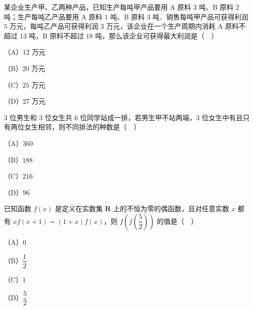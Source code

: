 \begin{question}
某企业生产甲、乙两种产品，已知生产每吨甲产品要用 A 原料 $3$ 吨、B 原料 $2$ 吨；生产每吨乙产品要用 A 原料 $1$ 吨、B 原料 $3$ 吨．销售每吨甲产品可获得利润 $5$ 万元，每吨乙产品可获得利润 $3$ 万元，该企业在一个生产周期内消耗 A 原料不超过 $13$ 吨，B 原料不超过 $18$ 吨，那么该企业可获得最大利润是（　）

（A）$12$ 万元

（B）$20$ 万元

（C）$25$ 万元

（D）$27$ 万元

\end{question}
\begin{question}
$3$ 位男生和 $3$ 位女生共 $6$ 位同学站成一排，若男生甲不站两端，$3$ 位女生中有且只有两位女生相邻，则不同排法的种数是（　）

（A）$360$

（B）$188$

（C）$216$

（D）$96$

\end{question}
\begin{question}
已知函数 $f(x)$ 是定义在实数集 $\mathbf R$ 上的不恒为零的偶函数，且对任意实数 $x$ 都有 $xf(x+1)=(1+x)f(x)$，则 $f\left(f\left(\dfrac52\right)\right)$ 的值是（　）

（A）$0$

（B）$\dfrac12$

（C）$1$

（D）$\dfrac52$

\end{question}

